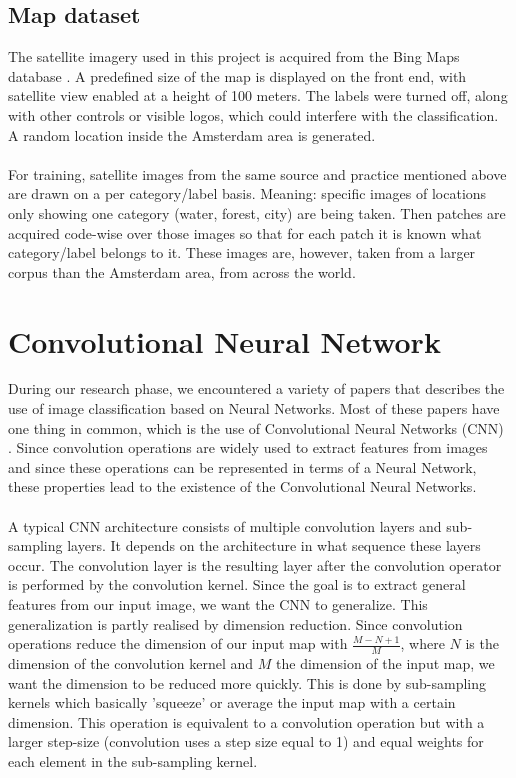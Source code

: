 \documentclass[a4paper,onecolumn]{report}
\begin{document}
\section{Map dataset}
The satellite imagery used in this project is acquired from the Bing Maps database \cite{bing}. A predefined size of the map is displayed on the front end, with satellite view enabled at a height of 100 meters. The labels were turned off, along with other controls or visible logos, which could interfere with the classification.  A random location inside the Amsterdam area is generated.\\
\\
For training, satellite images from the same source and practice mentioned above are drawn on a per category/label basis. Meaning: specific images of locations only showing one category (water, forest, city) are being taken. Then patches are acquired code-wise over those images so that for each patch it is known what category/label belongs to it. These images are, however, taken from a larger corpus than the Amsterdam area, from across the world.

\chapter{Convolutional Neural Network}
\label{chap:CNN}
During our research phase, we encountered a variety of papers that describes the use of image classification based on Neural Networks. Most of these papers have one thing in common, which is the use of Convolutional Neural Networks (CNN) \cite{Hongsheng2014} \cite{Farabet2013}. Since convolution operations are widely used to extract features from images and since these operations can be represented in terms of a Neural Network, these properties lead to the existence of the Convolutional Neural Networks.
\\\\
A typical CNN architecture consists of multiple convolution layers and sub-sampling layers. It depends on the architecture in what sequence these layers occur. The convolution layer is the resulting layer after the convolution operator is performed by the convolution kernel. Since the goal is to extract general features from our input image, we want the CNN to generalize. This generalization is partly realised by dimension reduction. Since convolution operations reduce the dimension of our input map with $\frac{M-N+1}{M}$, where $N$ is the dimension of the convolution kernel and $M$ the dimension of the input map, we want the dimension to be reduced more quickly. This is done by sub-sampling kernels which basically 'squeeze' or average the input map with a certain dimension. This operation is equivalent to a convolution operation but with a larger step-size (convolution uses a step size equal to 1) and equal weights for each element in the sub-sampling kernel.
\end{document}
